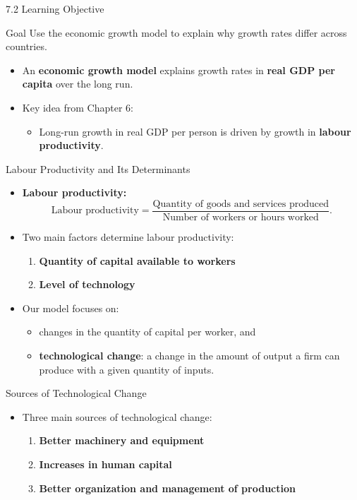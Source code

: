 \documentclass[aspectratio=169]{beamer}
\begin{document}
\begin{frame}{7.2 Learning Objective}
\transfade
\begin{block}{Goal}
Use the economic growth model to explain why growth rates differ across countries.
\end{block}
\begin{itemize}[<+->]
  \item An \textbf{economic growth model} explains growth rates in \textbf{real GDP per capita} over the long run.
  \item Key idea from Chapter 6:
  \begin{itemize}[<+->]
    \item Long-run growth in real GDP per person is driven by growth in \textbf{labour productivity}.
  \end{itemize}
\end{itemize}
\end{frame}

\begin{frame}{Labour Productivity and Its Determinants}
\transfade
\begin{itemize}[<+->]
  \item \textbf{Labour productivity:}
  \[
    \text{Labour productivity} =
    \frac{\text{Quantity of goods and services produced}}{\text{Number of workers or hours worked}}.
  \]
  \item Two main factors determine labour productivity:
  \begin{enumerate}[<+->]
    \item \textbf{Quantity of capital available to workers}
    \item \textbf{Level of technology}
  \end{enumerate}
  \item Our model focuses on:
  \begin{itemize}[<+->]
    \item changes in the quantity of capital per worker, and
    \item \textbf{technological change}: a change in the amount of output a firm can produce with a given quantity of inputs.
  \end{itemize}
\end{itemize}
\end{frame}

\begin{frame}{Sources of Technological Change}
\transfade
\begin{itemize}[<+->]
  \item Three main sources of technological change:
  \begin{enumerate}[<+->]
    \item \textbf{Better machinery and equipment}
    \item \textbf{Increases in human capital}
    \item \textbf{Better organization and management of production}
  \end{enumerate}
\end{itemize}
\end{frame}
\end{document}
